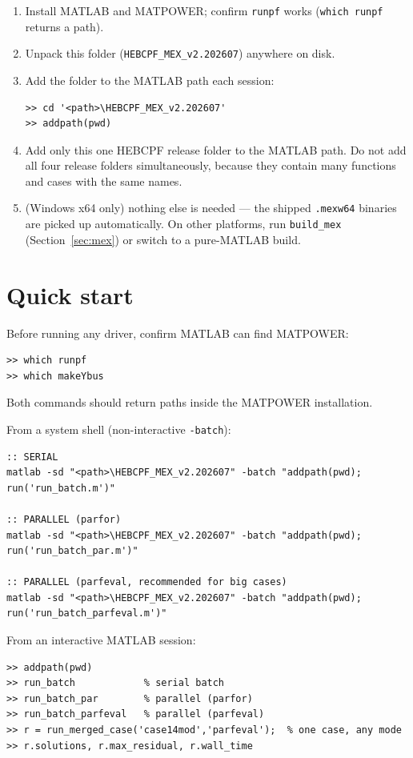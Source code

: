 \documentclass[11pt,a4paper]{article}
\newcommand{\code}[1]{\texttt{#1}}
\begin{document}
\begin{enumerate}[leftmargin=1.6em]
  \item Install MATLAB and MATPOWER; confirm \code{runpf} works
        (\code{which runpf} returns a path).
  \item Unpack this folder (\code{HEBCPF_MEX_v2.202607}) anywhere on disk.
  \item Add the folder to the MATLAB path each session:
\begin{lstlisting}
>> cd '<path>\HEBCPF_MEX_v2.202607'
>> addpath(pwd)
\end{lstlisting}
  \item Add only this one HEBCPF release folder to the MATLAB path. Do not add all four
        release folders simultaneously, because they contain many functions and cases with
        the same names.
  \item (Windows x64 only) nothing else is needed --- the shipped \code{.mexw64} binaries
        are picked up automatically. On other platforms, run \code{build_mex}
        (Section~\ref{sec:mex}) or switch to a pure-MATLAB build.
\end{enumerate}

\section{Quick start}

Before running any driver, confirm MATLAB can find MATPOWER:
\begin{lstlisting}[style=mat]
>> which runpf
>> which makeYbus
\end{lstlisting}
Both commands should return paths inside the MATPOWER installation.

From a system shell (non-interactive \code{-batch}):
\begin{lstlisting}[style=sh]
:: SERIAL
matlab -sd "<path>\HEBCPF_MEX_v2.202607" -batch "addpath(pwd); run('run_batch.m')"

:: PARALLEL (parfor)
matlab -sd "<path>\HEBCPF_MEX_v2.202607" -batch "addpath(pwd); run('run_batch_par.m')"

:: PARALLEL (parfeval, recommended for big cases)
matlab -sd "<path>\HEBCPF_MEX_v2.202607" -batch "addpath(pwd); run('run_batch_parfeval.m')"
\end{lstlisting}

From an interactive MATLAB session:
\begin{lstlisting}[style=mat]
>> addpath(pwd)
>> run_batch            % serial batch
>> run_batch_par        % parallel (parfor)
>> run_batch_parfeval   % parallel (parfeval)
>> r = run_merged_case('case14mod','parfeval');  % one case, any mode
>> r.solutions, r.max_residual, r.wall_time
\end{lstlisting}
\end{document}

